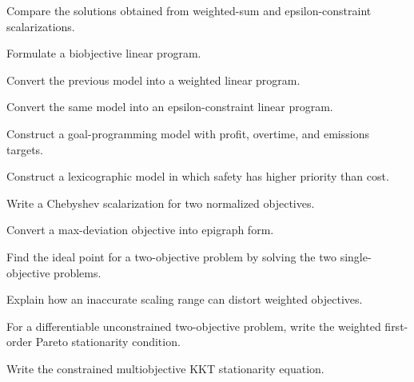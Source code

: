\begin{exercise}[3]
Compare the solutions obtained from weighted-sum and epsilon-constraint
scalarizations.
\end{exercise}

\begin{exercise}[3]
Formulate a biobjective linear program.
\end{exercise}

\begin{exercise}[3]
Convert the previous model into a weighted linear program.
\end{exercise}

\begin{exercise}[3]
Convert the same model into an epsilon-constraint linear program.
\end{exercise}

\begin{exercise}[3]
Construct a goal-programming model with profit, overtime, and emissions
targets.
\end{exercise}

\begin{exercise}[3]
Construct a lexicographic model in which safety has higher priority than
cost.
\end{exercise}

\begin{exercise}[3]
Write a Chebyshev scalarization for two normalized objectives.
\end{exercise}

\begin{exercise}[3]
Convert a max-deviation objective into epigraph form.
\end{exercise}

\begin{exercise}[3]
Find the ideal point for a two-objective problem by solving the two
single-objective problems.
\end{exercise}

\begin{exercise}[3]
Explain how an inaccurate scaling range can distort weighted objectives.
\end{exercise}

\begin{exercise}[3]
For a differentiable unconstrained two-objective problem, write the
weighted first-order Pareto stationarity condition.
\end{exercise}

\begin{exercise}[3]
Write the constrained multiobjective KKT stationarity equation.
\end{exercise}

